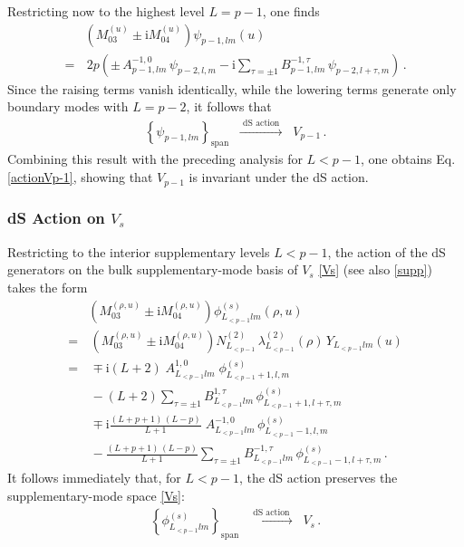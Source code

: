 \documentclass[aps,twocolumn,nofootinbib]{revtex4}
\begin{document}
{\begin{appendix}
Restricting now to the highest level $L=p-1$, one finds
\begin{align}
    &\!\!\!\!\!\!\!\left(M_{03}^{(u)} \pm \mathrm{i}M_{04}^{(u)}\right)\psi^{}_{p-1,lm}(u) \nonumber\\[3pt]
    =&\, 2p \left( \pm\, A^{-1,0}_{p-1,lm}\, \psi^{}_{p-2,l,m} - \mathrm{i}\!\!\sum_{\tau=\pm1}\!\! B^{-1,\tau}_{p-1,lm}\, \psi^{}_{p-2,l+\tau,m} \right) \,.
\end{align}
Since the raising terms vanish identically, while the lowering terms generate only boundary modes with $L=p-2$, it follows that
\begin{align}
    \left\{\psi^{}_{p-1,lm}\right\}_{\mathrm{span}} \;\;\xrightarrow[]{\text{ dS action }}\;\; V_{p-1}\,.
\end{align}
Combining this result with the preceding analysis for $L<p-1$, one obtains Eq. \eqref{actionVp-1}, showing that $V_{p-1}$ is invariant under the dS action.


\subsubsection{dS Action on $V_s$}

Restricting to the interior supplementary levels $L<p-1$, the action of the dS generators on the bulk supplementary-mode basis of $V_s$ \eqref{Vs} (see also \eqref{supp}) takes the form
\begin{align}
    &\!\!\!\!\!\!\!\left(M_{03}^{(\rho, u)} \pm \mathrm{i}M_{04}^{(\rho, u)}\right) \phi^{(s)}_{L^{}_{<p-1}lm}(\rho,u) \nonumber\\[3pt]
    =&\, \left(M_{03}^{(\rho, u)} \pm \mathrm{i} M_{04}^{(\rho, u)}\right) N^{(2)}_{L_{<p-1}}\, \lambda_{L_{<p-1}}^{(2)}(\rho)\, Y^{}_{L^{}_{<p-1}lm}(u) \nonumber\\[3pt]
    =&\, \mp\mathrm{i} (L+2) \; A^{1,0}_{L^{}_{<p-1}lm}\;\phi^{(s)}_{L^{}_{<p-1}+1,l,m} \nonumber\\[3pt]    
    &\, - (L+2) \sum_{\tau=\pm1} B^{1,\tau}_{L^{}_{<p-1}lm} \, \phi^{(s)}_{L^{}_{<p-1}+1,l+\tau,m} \nonumber\\[3pt]
    &\, \mp \mathrm{i} \frac{(L+p+1)\, (L-p)}{L+1} \; A^{-1,0}_{L^{}_{<p-1}lm}\, \phi^{(s)}_{L^{}_{<p-1}-1,l,m} \nonumber\\[3pt]
    &\, - \frac{(L+p+1)\, (L-p)}{L+1} \! \sum_{\tau=\pm1} \! B^{-1,\tau}_{L^{}_{<p-1}lm}\, \phi^{(s)}_{L^{}_{<p-1}-1,l+\tau,m} \,.
\end{align}
It follows immediately that, for $L<p-1$, the dS action preserves the supplementary-mode space \eqref{Vs}:
\begin{align}
    \left\{\phi^{(s)}_{L^{}_{<p-1}lm}\right\}_{\mathrm{span}} \;\;\xrightarrow[]{\text{ dS action }}\;\; V_s \,.
\end{align}


\end{appendix}}
\end{document}
